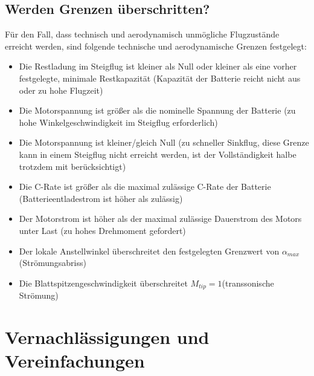 \subsection{Werden Grenzen überschritten?}
Für den Fall, dass technisch und aerodynamisch unmögliche Flugzustände erreicht werden, sind folgende technische und aerodynamische Grenzen festgelegt:
\begin{itemize}
	\item Die Restladung im Steigflug ist kleiner als  Null oder kleiner als eine vorher festgelegte, minimale Restkapazität (Kapazität der Batterie reicht nicht aus oder zu hohe Flugzeit)
	\item Die Motorspannung ist größer als die nominelle Spannung der Batterie (zu hohe Winkelgeschwindigkeit im Steigflug erforderlich)
	\item Die Motorspannung ist kleiner/gleich Null (zu schneller Sinkflug, diese Grenze kann in einem Steigflug nicht erreicht werden, ist der Vollständigkeit halbe trotzdem mit berücksichtigt)
	\item Die C-Rate ist größer als die maximal zulässige C-Rate der Batterie (Batterieentladestrom ist höher als zulässig)
	\item Der Motorstrom ist höher als der maximal zulässige Dauerstrom des Motors unter Last (zu hohes Drehmoment gefordert)
	\item Der lokale Anstellwinkel überschreitet den festgelegten Grenzwert von \ensuremath{\alpha_{max}}(Strömungsabriss)
	\item Die Blattspitzengeschwindigkeit überschreitet \ensuremath{M_{tip}=1}(transsonische Strömung)
\end{itemize}

\section{Vernachlässigungen und Vereinfachungen}
\label{sec:vernachlaessigungen_vereinfachungen}

